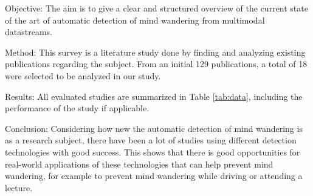 Objective: The aim is to give a clear and structured overview of the current state of the art of automatic detection of mind wandering from multimodal datastreams.

Method: This survey is a literature study done by finding and analyzing existing publications regarding the subject. From an initial 129 publications, a total of 18 were selected to be analyzed in our study.

Results: All evaluated studies are summarized in Table \ref{tab:data}, including the performance of the study if applicable.

Conclusion: Considering how new the automatic detection of mind wandering is as a research subject, there have been a lot of studies using different detection technologies with good success. This shows that there is good opportunities for real-world applications of these technologies that can help prevent mind wandering, for example to prevent mind wandering while driving or attending a lecture.